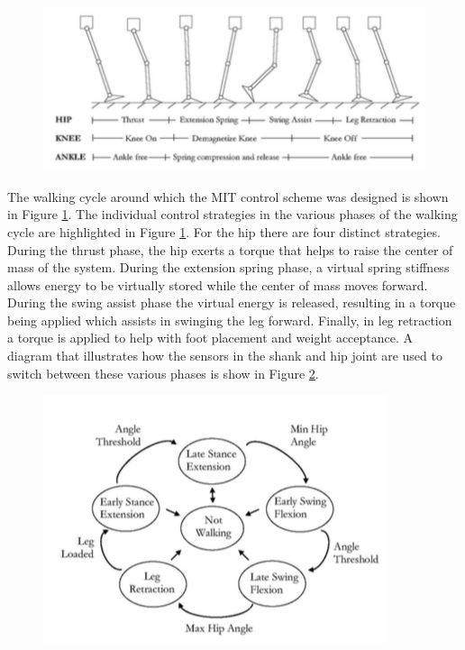 \begin{figure}[thpb]
\centering
\includegraphics[width=4.in]{exos/figs/MIT/walkingCycle}
  \caption{}
  \vspace{-0.2in}
 \label{fig:walkingCycle} 
 \end{figure} 
The walking cycle around which the MIT control scheme was designed is shown in Figure \ref{fig:walkingCycle}.  The individual control strategies in the various phases of the walking cycle are highlighted in Figure \ref{fig:walkingCycle}.  For the hip there are four distinct strategies.  During the thrust phase, the hip exerts a torque that helps to raise the center of mass of the system.  During the extension spring phase, a virtual spring stiffness allows energy to be virtually stored while the center of mass moves forward.  During the swing assist phase the virtual energy is released, resulting in a torque being applied which assists in swinging the leg forward.  Finally, in leg retraction a torque is applied to help with foot placement and weight acceptance.  A diagram that illustrates how the sensors in the shank and hip joint are used to switch between these various phases is show in Figure \ref{fig:hipControl}.
 \begin{figure}[thpb]
\centering
\includegraphics[width=3.in]{exos/figs/MIT/hipControl}
  \caption{}
  \vspace{-0.2in}
 \label{fig:hipControl} 
 \end{figure}  
 
